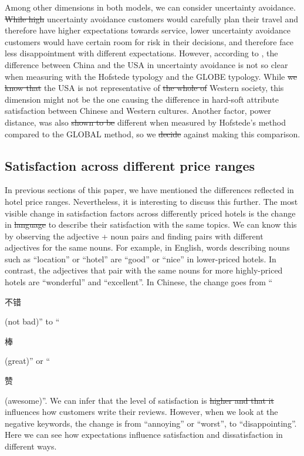 \documentclass[smallextended,natbib]{svjour3}       %
\providecommand{\DIFadd}[1]{{\protect\color{blue}\uwave{#1}}} %
\providecommand{\DIFdel}[1]{{\protect\color{red}\sout{#1}}}                      %
\providecommand{\DIFaddbegin}{} %
\providecommand{\DIFaddend}{} %
\providecommand{\DIFdelbegin}{} %
\providecommand{\DIFdelend}{} %
\newcommand{\DIFscaledelfig}{0.5}
\newlength{\DIFdelgraphicswidth} %
\newlength{\DIFdelgraphicsheight} %
\newcommand{\DIFaddincludegraphics}[2][]{{\color{blue}\fbox{\DIFOincludegraphics[#1]{#2}}}} %
\newcommand{\DIFdelincludegraphics}[2][]{%
\sbox{\DIFdelgraphicsbox}{\DIFOincludegraphics[#1]{#2}}%
\settoboxwidth{\DIFdelgraphicswidth}{\DIFdelgraphicsbox} %
\settoboxtotalheight{\DIFdelgraphicsheight}{\DIFdelgraphicsbox} %
\scalebox{\DIFscaledelfig}{%
\parbox[b]{\DIFdelgraphicswidth}{\usebox{\DIFdelgraphicsbox}\\[-\baselineskip] \rule{\DIFdelgraphicswidth}{0em}}\llap{\resizebox{\DIFdelgraphicswidth}{\DIFdelgraphicsheight}{%
\setlength{\unitlength}{\DIFdelgraphicswidth}%
\begin{picture}(1,1)%
\thicklines\linethickness{2pt} %
{\color[rgb]{1,0,0}\put(0,0){\framebox(1,1){}}}%
{\color[rgb]{1,0,0}\put(0,0){\line( 1,1){1}}}%
{\color[rgb]{1,0,0}\put(0,1){\line(1,-1){1}}}%
\end{picture}%
}\hspace*{3pt}}} %
} %
\DeclareRobustCommand{\DIFaddbegin}{\DIFOaddbegin \let\includegraphics\DIFaddincludegraphics} %
\DeclareRobustCommand{\DIFaddend}{\DIFOaddend \let\includegraphics\DIFOincludegraphics} %
\DeclareRobustCommand{\DIFdelbegin}{\DIFOdelbegin \let\includegraphics\DIFdelincludegraphics} %
\DeclareRobustCommand{\DIFdelend}{\DIFOaddend \let\includegraphics\DIFOincludegraphics} %
\begin{document}
    Among other dimensions in both models, we can consider uncertainty avoidance. \DIFdelbegin \DIFdel{While high }\DIFdelend \DIFaddbegin \DIFadd{High }\DIFaddend uncertainty avoidance customers would carefully plan their travel and therefore have higher expectations towards service\DIFaddbegin \DIFadd{. On the other hand}\DIFaddend , lower uncertainty avoidance customers would have certain room for risk in their decisions, and therefore face less disappointment with different expectations. However, according to \cite{xiumei2011cultural}, the difference between China and the USA in uncertainty avoidance is not so clear when measuring with the Hofstede typology and the GLOBE typology. While \DIFdelbegin \DIFdel{we know that }\DIFdelend the USA is not representative of \DIFdelbegin \DIFdel{the whole of }\DIFdelend Western society, this dimension might not be the one causing the difference in hard-soft attribute satisfaction between Chinese and Western cultures. Another factor, power distance, was also \DIFdelbegin \DIFdel{shown to be }\DIFdelend different when measured by Hofstede's method compared to the GLOBAL method, so we \DIFdelbegin \DIFdel{decide }\DIFdelend \DIFaddbegin \DIFadd{decided }\DIFaddend against making this comparison.

  \subsection{Satisfaction across different price ranges}\label{disc:price}

    In previous sections of this paper, we have mentioned the differences reflected in hotel price ranges. Nevertheless, it is interesting to discuss this further. The most visible change in satisfaction factors across differently priced hotels is the change in \DIFdelbegin \DIFdel{language }\DIFdelend \DIFaddbegin \DIFadd{voice }\DIFaddend to describe their satisfaction with the same topics. We can know this by observing the adjective + noun pairs and finding pairs with different adjectives for the same nouns. For example, in English, words describing nouns such as ``location'' or ``hotel'' are ``good'' or ``nice'' in lower-priced hotels. In contrast, the adjectives that pair with the same nouns for more highly-priced hotels are ``wonderful'' and ``excellent''. In Chinese, the change goes from ``\begin{CJK}{UTF8}{gbsn}不错\end{CJK} (not bad)'' to ``\begin{CJK}{UTF8}{gbsn}棒\end{CJK} (great)'' or ``\begin{CJK}{UTF8}{gbsn}赞\end{CJK} (awesome)''. We can infer that the level of satisfaction is \DIFdelbegin \DIFdel{higher and that it }\DIFdelend \DIFaddbegin \DIFadd{high and }\DIFaddend influences how customers write their reviews. However, when we look at the negative keywords, the change is from ``annoying'' or ``worst'', to ``disappointing''. Here we can see how expectations influence satisfaction and dissatisfaction in different ways. 
\end{document}
